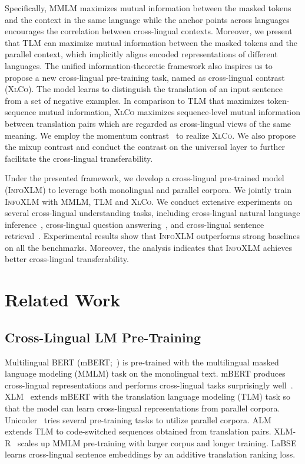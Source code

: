 \documentclass[11pt,a4paper]{article}
\newcommand\our{\textsc{InfoXLM}}
\newcommand\xlco{\textsc{XlCo}}
\begin{document}
Specifically, MMLM maximizes mutual information between the masked tokens and the context in the same language while the anchor points across languages encourages the correlation between cross-lingual contexts.
Moreover, we present that TLM can maximize mutual information between the masked tokens and the parallel context, which implicitly aligns encoded representations of different languages.
The unified information-theoretic framework also inspires us to propose a new cross-lingual pre-training task, named as cross-lingual contrast (\xlco{}).
The model learns to distinguish the translation of an input sentence from a set of negative examples. 
In comparison to TLM that maximizes token-sequence mutual information, \xlco{} maximizes sequence-level mutual information between translation pairs which are regarded as cross-lingual views of the same meaning.
We employ the momentum contrast~\cite{moco} to realize \xlco{}.
We also propose the mixup contrast and conduct the contrast on the universal layer to further facilitate the cross-lingual transferability.

Under the presented framework, we develop a cross-lingual pre-trained model (\our{}) to leverage both monolingual and parallel corpora.
We jointly train \our{} with MMLM, TLM and \xlco{}.
We conduct extensive experiments on several cross-lingual understanding tasks, including cross-lingual natural language inference~\cite{xnli}, cross-lingual question answering~\cite{mlqa}, and cross-lingual sentence retrieval~\cite{tatoeba}.
Experimental results show that \our{} outperforms strong baselines on all the benchmarks.
Moreover, the analysis indicates that \our{} achieves better cross-lingual transferability.


\section{Related Work}

\subsection{Cross-Lingual LM Pre-Training}

Multilingual BERT (mBERT;~\citealt{bert}) is pre-trained with the multilingual masked language modeling (MMLM) task on the monolingual text.
mBERT produces cross-lingual representations and performs cross-lingual tasks surprisingly well~\cite{wu2019beto}.
XLM~\cite{xlm} extends mBERT with the translation language modeling (TLM) task so that the model can learn cross-lingual representations from parallel corpora.
Unicoder~\cite{unicoder} tries several pre-training tasks to utilize parallel corpora.
ALM~\cite{alm} extends TLM to code-switched sequences obtained from translation pairs.
XLM-R~\cite{xlmr} scales up MMLM pre-training with larger corpus and longer training.
LaBSE~\cite{labse} learns cross-lingual sentence embeddings by an additive translation ranking loss.
\end{document}
